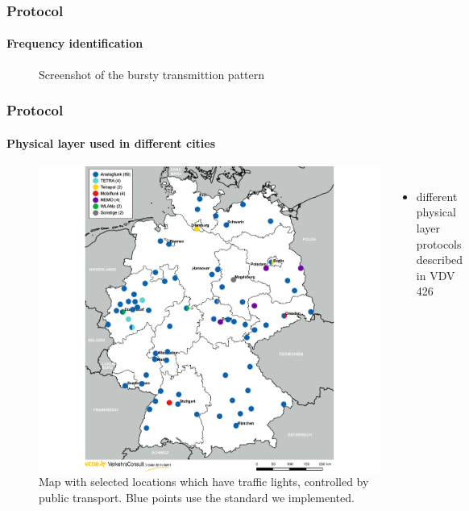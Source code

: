 \documentclass[aspectratio=169]{beamer}
\begin{document}

\begin{frame}
\frametitle{Protocol}
\framesubtitle{Frequency identification}
\begin{figure}
\centering
\missingfigure[figwidth=7cm]{}
\caption{Screenshot of the bursty transmittion pattern}
\end{figure}
\end{frame}


\begin{frame}
\frametitle{Protocol}
\framesubtitle{Physical layer used in different cities}
\begin{figure}
\centering
\begin{columns}
\includegraphics[height=0.8\textheight]{figs/vcdb-map-ampelbeeinflussung.png}
\caption{Map with selected locations which have traffic lights, controlled by public transport. Blue points use the standard we implemented.}
\vspace{0.5cm}
\begin{itemize}
	\item different physical layer protocols described in VDV 426
\end{itemize}
\end{columns}
\end{figure}
\end{frame}
\end{document}
